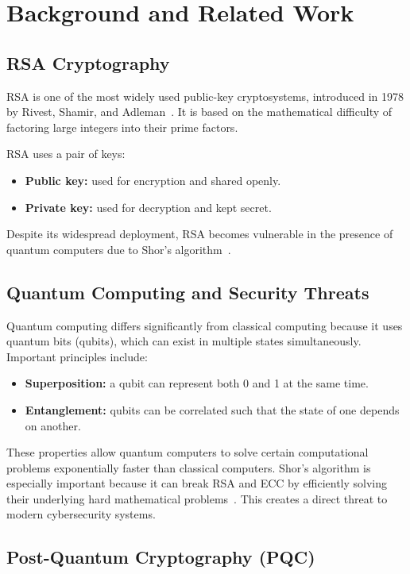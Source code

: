 \documentclass[12pt,a4paper]{article}
\begin{document}
\section{Background and Related Work}

\subsection{RSA Cryptography}

RSA is one of the most widely used public-key cryptosystems, introduced in 1978 by Rivest, Shamir, and Adleman~\cite{rsa1978}. It is based on the mathematical difficulty of factoring large integers into their prime factors.

RSA uses a pair of keys:
\begin{itemize}[leftmargin=2em]
    \item \textbf{Public key:} used for encryption and shared openly.
    \item \textbf{Private key:} used for decryption and kept secret.
\end{itemize}

Despite its widespread deployment, RSA becomes vulnerable in the presence of quantum computers due to Shor's algorithm~\cite{shor1997}.

\subsection{Quantum Computing and Security Threats}

Quantum computing differs significantly from classical computing because it uses quantum bits (qubits), which can exist in multiple states simultaneously. Important principles include:
\begin{itemize}[leftmargin=2em]
    \item \textbf{Superposition:} a qubit can represent both 0 and 1 at the same time.
    \item \textbf{Entanglement:} qubits can be correlated such that the state of one depends on another.
\end{itemize}

These properties allow quantum computers to solve certain computational problems exponentially faster than classical computers. Shor's algorithm is especially important because it can break RSA and ECC by efficiently solving their underlying hard mathematical problems~\cite{shor1994,shor1997}. This creates a direct threat to modern cybersecurity systems.

\subsection{Post-Quantum Cryptography (PQC)}
\end{document}
